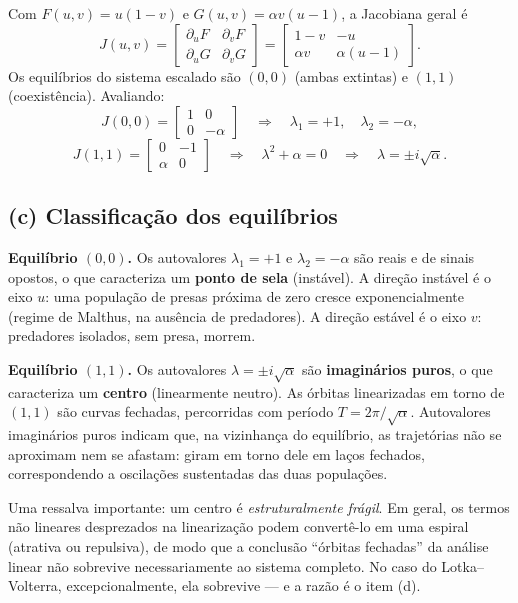 \documentclass{article}
\begin{document}
Com $F(u,v) = u(1 - v)$ e $G(u,v) = \alpha v(u - 1)$, a Jacobiana geral é
\[
J(u,v) =
\begin{bmatrix}
\partial_u F & \partial_v F \\[2pt]
\partial_u G & \partial_v G
\end{bmatrix}
=
\begin{bmatrix}
1 - v & -u \\[2pt]
\alpha v & \alpha(u - 1)
\end{bmatrix}.
\]
Os equilíbrios do sistema escalado são $(0,0)$ (ambas extintas) e $(1,1)$
(coexistência). Avaliando:
\[
J(0,0) =
\begin{bmatrix}
1 & 0 \\
0 & -\alpha
\end{bmatrix}
\quad\Longrightarrow\quad
\lambda_1 = +1, \quad \lambda_2 = -\alpha,
\]
\[
J(1,1) =
\begin{bmatrix}
0 & -1 \\
\alpha & 0
\end{bmatrix}
\quad\Longrightarrow\quad
\lambda^2 + \alpha = 0
\quad\Longrightarrow\quad
\lambda = \pm i\sqrt{\alpha}.
\]

\subsection*{(c) Classificação dos equilíbrios}

\textbf{Equilíbrio $(0,0)$.} Os autovalores $\lambda_1 = +1$ e $\lambda_2 = -\alpha$
são reais e de sinais opostos, o que caracteriza um \textbf{ponto de sela}
(instável). A direção instável é o eixo $u$: uma população de presas próxima de
zero cresce exponencialmente (regime de Malthus, na ausência de predadores). A
direção estável é o eixo $v$: predadores isolados, sem presa, morrem.

\textbf{Equilíbrio $(1,1)$.} Os autovalores $\lambda = \pm i\sqrt{\alpha}$ são
\textbf{imaginários puros}, o que caracteriza um \textbf{centro} (linearmente
neutro). As órbitas linearizadas em torno de $(1,1)$ são curvas fechadas,
percorridas com período $T = 2\pi/\sqrt{\alpha}$. Autovalores imaginários puros
indicam que, na vizinhança do equilíbrio, as trajetórias não se aproximam nem se
afastam: giram em torno dele em laços fechados, correspondendo a oscilações
sustentadas das duas populações.

Uma ressalva importante: um centro é \textit{estruturalmente frágil}. Em geral,
os termos não lineares desprezados na linearização podem convertê-lo em uma
espiral (atrativa ou repulsiva), de modo que a conclusão ``órbitas fechadas'' da
análise linear não sobrevive necessariamente ao sistema completo. No caso do
Lotka--Volterra, excepcionalmente, ela sobrevive — e a razão é o item (d).
\end{document}
